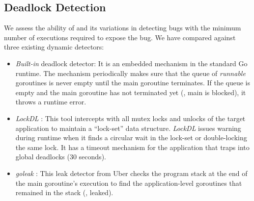 %

\subsection{Deadlock Detection}
\label{sec:dl_evaluation}
We assess the ability of \goat and its variations in detecting bugs with the minimum number of executions required to expose the bug.
%
We have compared \goat against three existing dynamic detectors:
\begin{itemize}
  \item \textit{Built-in} deadlock detector: It is an embedded mechanism in the standard Go runtime. The mechanism periodically makes sure that the queue of \textit{runnable} goroutines is never empty until the main goroutine terminates. If the queue is empty and the main goroutine has not terminated yet (\ie, main is blocked), it throws a runtime error.
  \item \textit{LockDL} \cite{lockdl}: This tool intercepts with all mutex locks and unlocks of the target application to maintain a ``lock-set'' data structure. \textit{LockDL} issues warning during runtime when it finds a circular wait in the lock-set or double-locking the same lock. It has a timeout mechanism for the application that traps into global deadlocks (30 seconds).
  \item \textit{goleak} \cite{goleak}: This leak detector from Uber checks the program stack at the end of the main goroutine's execution to find the application-level goroutines that remained in the stack (\ie, leaked).
\end{itemize}


